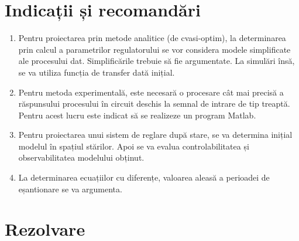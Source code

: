 \documentclass[11pt]{article}
\begin{document}
\section{Indicații și recomandări}
\begin{enumerate}[label=\alph*)]
	\item Pentru proiectarea prin metode analitice (de cvasi-optim), la determinarea prin calcul a parametrilor regulatorului se vor considera modele simplificate ale procesului dat. Simplificările trebuie să fie argumentate. La simulări însă, se va utiliza funcția de transfer dată inițial.
	\item Pentru metoda experimentală, este necesară o procesare cât mai precisă a răspunsului procesului în circuit deschis la semnal de intrare de tip treaptă. Pentru acest lucru este indicat să se realizeze un program Matlab.
	\item Pentru proiectarea unui sistem de reglare după stare, se va determina inițial modelul în spațiul stărilor. Apoi se va evalua controlabilitatea și observabilitatea modelului obținut.
	\item La determinarea ecuațiilor cu diferențe, valoarea aleasă a perioadei de eșantionare se va argumenta.
\end{enumerate}
\newpage
\section{Rezolvare}
\end{document}
